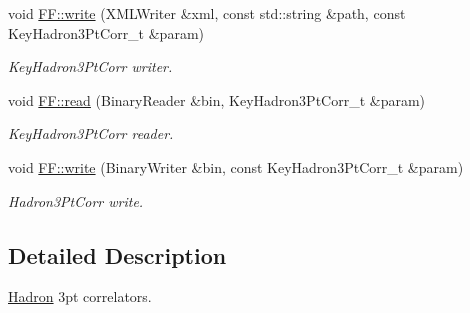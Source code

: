 \begin{DoxyCompactItemize}
void \mbox{\hyperlink{namespaceFF_a9e6eed897710dbad982d5a699a70f857}{F\+F\+::write}} (X\+M\+L\+Writer \&xml, const std\+::string \&path, const Key\+Hadron3\+Pt\+Corr\+\_\+t \&param)
\begin{DoxyCompactList}\small\item\em Key\+Hadron3\+Pt\+Corr writer. \end{DoxyCompactList}\item 
void \mbox{\hyperlink{namespaceFF_a257b587cc1107da7cde8c3d17ea5ce50}{F\+F\+::read}} (Binary\+Reader \&bin, Key\+Hadron3\+Pt\+Corr\+\_\+t \&param)
\begin{DoxyCompactList}\small\item\em Key\+Hadron3\+Pt\+Corr reader. \end{DoxyCompactList}\item 
void \mbox{\hyperlink{namespaceFF_a7d3abdd11ac7f8c96ec4cfab1360b20a}{F\+F\+::write}} (Binary\+Writer \&bin, const Key\+Hadron3\+Pt\+Corr\+\_\+t \&param)
\begin{DoxyCompactList}\small\item\em Hadron3\+Pt\+Corr write. \end{DoxyCompactList}\end{DoxyCompactItemize}


\subsection{Detailed Description}
\mbox{\hyperlink{namespaceHadron}{Hadron}} 3pt correlators. 


